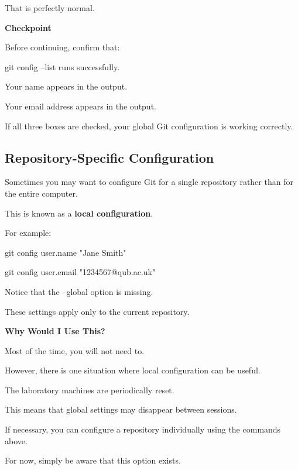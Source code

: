 \documentclass{csc2059practical}
\begin{document}
That is perfectly normal.

\begin{reflectionbox}
\textbf{Checkpoint}\par
\medskip

Before continuing, confirm that:


\end{reflectionbox}
\begin{terminalplain}
git config --list runs successfully.
\end{terminalplain}
Your name appears in the output.

Your email address appears in the output.

If all three boxes are checked, your global Git configuration is working correctly.

\subsection{Repository-Specific Configuration}
Sometimes you may want to configure Git for a single repository rather than for the entire computer.

This is known as a \textbf{local configuration}.

For example:

\begin{terminalplain}
git config user.name "Jane Smith"
\end{terminalplain}
\begin{terminalplain}
git config user.email "1234567@qub.ac.uk"
\end{terminalplain}
Notice that the --global option is missing.

These settings apply only to the current repository.

\begin{importantnote}
  \textbf{Why Would I Use This?}

  Most of the time, you will not need to.
  
  However, there is one situation where local configuration can be useful.
  
  The laboratory machines are periodically reset.
  
  This means that global settings may disappear between sessions.
  
  If necessary, you can configure a repository individually using the commands above.
  
  For now, simply be aware that this option exists.
\end{importantnote}
\end{document}
